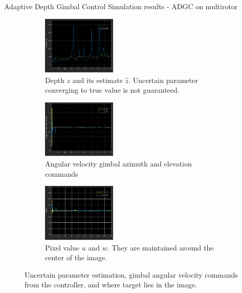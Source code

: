 \documentclass[9pt]{beamer}
\newenvironment{figure*}%
{\begin{figure}}
{\end{figure}}
\begin{document}
\begin{frame}{Adaptive Depth Gimbal Control}
Simulation results - ADGC on multirotor	
\begin{figure}[htbp]
	\centering
	\begin{subfigure}{0.32\textwidth}
		\centering
		\includegraphics[width=1.4in]{chapter2/uav_z}
		\caption{Depth $z$ and its estimate $\hat{z}$. Uncertain parameter converging to true value is not guaranteed.}
	\end{subfigure}%
	\begin{subfigure}{0.32\textwidth}
		\centering
		\includegraphics[width=1.4in]{chapter2/uav_gimbal_command}
		\caption{Angular velocity gimbal azimuth and elevation commands}
	\end{subfigure}
	\begin{subfigure}{0.32\textwidth}
		\centering
		\includegraphics[width=1.4in]{chapter2/uav_pixel}
		\caption{Pixel value $u$ and $w$. They are maintained around the center of the image.}
	\end{subfigure}	
	\caption{Uncertain parameter estimation, gimbal angular velocity commands from the controller, and where target lies in the image.}
	\label{uav_adaptive_additional}
\end{figure}	
\end{frame}
\end{document}
